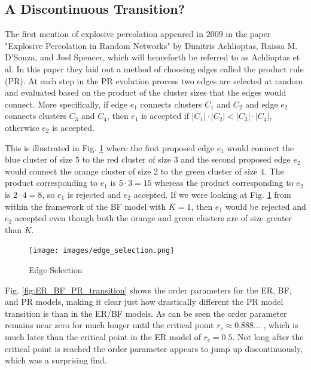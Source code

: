 \subsection{A Discontinuous Transition?}
The first mention of explosive percolation appeared in 2009 in the paper "Explosive Percolation in Random Networks" \cite{Achlioptas_1} by Dimitris Achlioptas, Raissa M. D’Souza, and Joel Spencer, which will henceforth be referred to as Achlioptas et al.
In this paper they laid out a method of choosing edges called the product rule (PR).
At each step in the PR evolution process two edges are selected at random and evaluated based on the product of the cluster sizes that the edges would connect.
More specifically, if edge $e_1$ connects clusters $C_1$ and $C_2$ and edge $e_2$ connects clusters $C_3$ and $C_4$, then $e_1$ is accepted if $|C_1| \cdot |C_2| < |C_3| \cdot |C_4|$, otherwise $e_2$ is accepted.

This is illustrated in Fig. \ref{fig:edge_selection} where the first proposed edge $e_1$ would connect the blue cluster of size 5 to the red cluster of size 3 and the second proposed edge $e_2$ would connect the orange cluster of size 2 to the green cluster of size 4.
The product corresponding to $e_1$ is $5 \cdot 3 = 15$ whereas the product corresponding to $e_2$ is $2 \cdot 4 = 8$, so $e_1$ is rejected and $e_2$ accepted.
If we were looking at Fig. \ref{fig:edge_selection} from within the framework of the BF model with $K = 1$, then $e_1$ would be rejected and $e_2$ accepted even though both the orange and green clusters are of size greater than $K$.

\begin{figure}[H]
	\centering
	\texttt{[image: images/edge\_selection.png]}
	\caption{Edge Selection}
	\label{fig:edge_selection}
\end{figure}

Fig. \ref{fig:ER_BF_PR_transition} shows the order parameters for the ER, BF, and PR models, making it clear just how drastically different the PR model transition is than in the ER/BF models.
As can be seen the order parameter remains near zero for much longer until the critical point $r_c \approx 0.888...$ \cite{Achlioptas_1}, which is much later than the critical point in the ER model of $r_c = 0.5$.
Not long after the critical point is reached the order parameter appears to jump up discontinuously, which was a surprising find.

